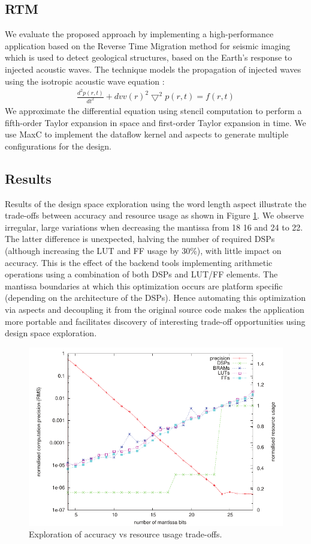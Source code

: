 \subsection{RTM}
We evaluate the proposed approach by implementing a high-performance
application based on the Reverse Time Migration method for seismic
imaging which is used to detect geological structures, based on the
Earth's response to injected acoustic waves. The technique models the
propagation of injected waves using the isotropic acoustic wave
equation \cite{araya2011assessing}:
\begin{align}
\frac{d^2p(r,t)}{dt^2} + {dvv(r)}^2\bigtriangledown^2p(r,t) = f(r,t)
\end{align}
We approximate the differential equation using stencil computation to
perform a fifth-order Taylor expansion in space and first-order Taylor
expansion in time. We use MaxC to implement the dataflow kernel and
aspects to generate multiple configurations for the design.

\subsection{Results}


Results of the design space exploration using the word length aspect
illustrate the trade-offs between accuracy and resource usage as shown
in Figure \ref{fig:precision}.  We observe irregular, large variations
when decreasing the mantissa from 18 16 and 24 to 22. The latter
difference is unexpected, halving the number of required DSPs
(although increasing the LUT and FF usage by 30\%), with little impact
on accuracy. This is the effect of the backend tools implementing
arithmetic operations using a combination of both DSPs and LUT/FF
elements. The mantissa boundaries at which this optimization occurs
are platform specific (depending on the architecture of the
DSPs). Hence automating this optimization via aspects and decoupling
it from the original source code makes the application more portable
and facilitates discovery of interesting trade-off opportunities using
design space exploration.

\begin{figure}[!h]
\includegraphics[scale=0.7]{figs/pre}
\caption{Exploration of accuracy vs resource usage trade-offs.}
\label{fig:precision}
\end{figure}

